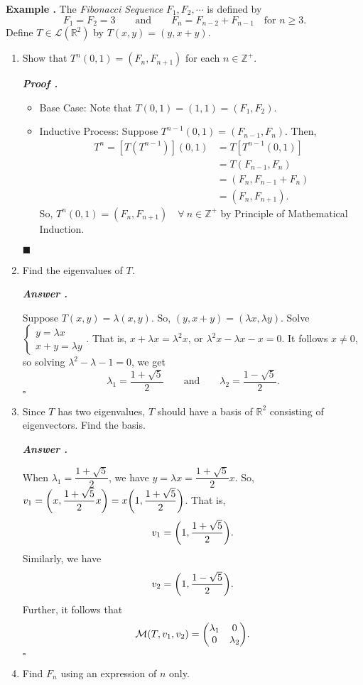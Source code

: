 \documentclass[11pt, letterpaper]{article}
\newcounter{index}[subsection]
\newenvironment*{eg}{\begin{framed}\par\noindent\textbf{Example \thesubsection.\stepcounter{index}\theindex}}{\par\end{framed}}
\newcounter{nprf}[subsection]
\newenvironment*{prf}{\par\indent\textbf{\textit{Proof \stepcounter{nprf}\thenprf.}}}{\hfill$\blacksquare$\par}
\newenvironment*{ans}{\par\indent\textbf{\textit{Answer \stepcounter{nprf}\thenprf.}}\par}{\hfill{$\square$}\par}
\def\Zp{\mathbb{Z}^+}
\def\R{\mathbb{R}}
\def\L{\mathcal{L}}
\def\M{\mathcal{M}}
\begin{document}
\begin{eg}
	The \textit{Fibonacci Sequence} $F_1,F_2,\cdots$ is defined by \[F_1=F_2=3\qquad\text{and}\qquad F_n=F_{n-2}+F_{n-1}\quad\text{for }n\geq3.\] Define $T\in\L(\R^2)$ by $T(x,y)=(y,x+y).$
	\begin{enumerate}
		\item Show that $T^n(0,1)=(F_n,F_{n+1})$ for each $n\in\Zp$.
		\begin{prf}
			\begin{itemize}
				\item Base Case: Note that $T(0,1)=(1,1)=(F_1,F_2)$.
				\item Inductive Process: Suppose $T^{n-1}(0,1)=(F_{n-1},F_n)$. Then, \[\begin{aligned}T^n=[T(T^{n-1})](0,1)&=T[T^{n-1}(0,1)]\\&=T(F_{n-1},F_n)\\&=(F_n,F_{n-1}+F_n)\\&=(F_n,F_{n+1}).\end{aligned}\] So, $T^n(0,1)=(F_n,F_{n+1})\quad\forall\ n\in\Zp$ by Principle of Mathematical Induction. 
			\end{itemize}
		\end{prf}
		\item Find the eigenvalues of $T$.
		\begin{ans}
			Suppose $T(x,y)=\lambda(x,y)$. So, $(y,x+y)=(\lambda x,\lambda y)$. Solve $\begin{cases}y=\lambda x\\x+y=\lambda y\end{cases}$. That is, $x+\lambda x=\lambda^2x$, or $\lambda^2x-\lambda x-x=0$. It follows $x\neq0$, so solving $\lambda^2-\lambda-1=0$, we get \[\lambda_1=\dfrac{1+\sqrt{5}}{2}\qquad\text{and}\qquad\lambda_2=\dfrac{1-\sqrt{5}}{2}.\]
		\end{ans}
		\item Since $T$ has two eigenvalues, $T$ should have a basis of $\R^2$ consisting of eigenvectors. Find the basis.
		\begin{ans}
			When $\lambda_1=\dfrac{1+\sqrt{5}}{2}$, we have $y=\lambda x=\dfrac{1+\sqrt{5}}{2}x$. So, $v_1=\qty(x,\dfrac{1+\sqrt{5}}{2}x)=x\qty(1,\dfrac{1+\sqrt{5}}{2})$. That is, \[v_1=\qty(1,\dfrac{1+\sqrt{5}}{2}).\] Similarly, we have \[v_2=\qty(1,\dfrac{1-\sqrt{5}}{2}).\] Further, it follows that \[\M(T,v_1,v_2)=\mqty(\lambda_1&0\\0&\lambda_2).\]
		\end{ans}
		\item Find $F_n$ using an expression of $n$ only. 

\end{enumerate}
\end{eg}
\end{document}
